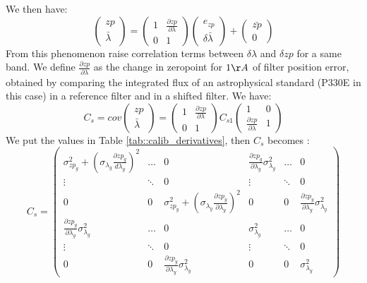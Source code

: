 \documentclass[\docopts]{\docclass}
\begin{document}
We then have:
\begin{equation}
\begin{pmatrix}
  zp \\
  \bar\lambda
\end{pmatrix}
=
\begin{pmatrix}
  1 & \frac{\partial zp}{\partial \lambda} \\
  0 & 1
\end{pmatrix}
\begin{pmatrix}
  e_{zp} \\
  \delta\bar\lambda
\end{pmatrix}
+
\begin{pmatrix}
  \bar{zp} \\
  0
\end{pmatrix}
\end{equation}
From this phenomenon raise correlation terms between $\delta \lambda$ and $\delta zp$ for a same band.
We define $\frac{\partial zp}{\partial \lambda}$ as the change in zeropoint for $1 \AA$ of filter position error, obtained by comparing the integrated flux of an astrophysical standard (P330E in this case) in a reference filter and in a shifted filter.
We have:
\begin{equation}
C_s = cov
\begin{pmatrix}
  zp \\
  \bar\lambda
\end{pmatrix}
=
\begin{pmatrix}
  1 & \frac{\partial zp}{\partial \lambda} \\
  0 & 1
\end{pmatrix}
C_{s1}
\begin{pmatrix}
  1 & 0 \\
  \frac{\partial zp}{\partial \lambda} & 1
\end{pmatrix}
\end{equation}
We put the values in Table \ref{tab::calib_derivatives}, then $C_s$ becomes :
\begin{equation}
\label{eq::cov_calib}
C_s = 
\begin{pmatrix}
  \sigma^2_{ zp_{g}} + (\sigma_{\lambda_g} \frac{\partial zp_g}{d\lambda_g})^2 & \ldots & 0 & \frac{\partial zp_g}{\partial \lambda_g} \sigma^2_{ \lambda_g} & \ldots & 0 \\
   \vdots & \ddots & 0 & \vdots & \ddots & 0 \\
   0 & 0 & \sigma^2_{ zp_{y}} + (\sigma_{\lambda_y} \frac{\partial zp_y}{\partial \lambda_y})^2 & 0 & 0 & \frac{\partial zp_y}{\partial \lambda_y} \sigma^2_{ \lambda_y} \\
   \frac{\partial zp_g}{\partial \lambda_g} \sigma^2_{ \lambda_g} & \ldots & 0 & \sigma^2_{\lambda_{g}} & \ldots & 0 \\
   \vdots & \ddots & 0 & \vdots & \ddots & 0 \\
   0 & 0 & \frac{\partial zp_y}{\partial \lambda_y} \sigma^2_{ \lambda_y} & 0 & 0 & \sigma^2_{\lambda_{y}}
\end{pmatrix}
\end{equation}
\end{document}
